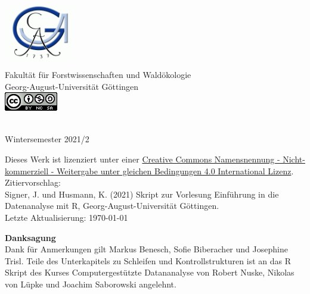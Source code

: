 \begin{titlepage}
\begin{center}
\vfill
\includegraphics[width=3cm,height=3cm]{misc/fig/logo-uni.png}
~\\[0.4cm]

Fakultät für Forstwissenschaften und Waldökologie \\
Georg-August-Universität Göttingen \\[1.2cm]
\includegraphics{misc/fig/logo_cc.png}
\vfill

\hRule ~\\[0.5cm]
{\large Wintersemester 2021/2}\\


\end{center}
\newpage
\vspace*{\fill}
Dieses Werk ist lizenziert unter einer \href{https://creativecommons.org/licenses/by-nc-sa/4.0/}{Creative Commons Namensnennung - Nicht-kommerziell - Weitergabe unter gleichen Bedingungen 4.0 International Lizenz}. \\[1cm]
Zitiervorschlag: \\
Signer, J. und Husmann, K. (2021) Skript zur Vorlesung Einführung in die Datenanalyse mit R, Georg-August-Universität Göttingen.
~\\[1cm]
Letzte Aktualisierung: \today

\newpage

{\bf Danksagung} \\[0.5cm]

Dank für Anmerkungen gilt Markus Benesch, Sofie Biberacher und Josephine Trisl.
Teile des Unterkapitels zu Schleifen und Kontrollstrukturen ist an das R Skript des Kurses Computergestützte Datananalyse von Robert Nuske, Nikolas von Lüpke und Joachim Saborowski angelehnt.
\end{titlepage}

